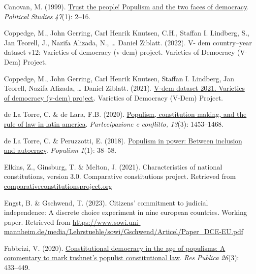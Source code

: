 \documentclass[
  abstract]{article}
\newlength{\cslhangindent}
\newlength{\cslentryspacingunit} %
\newenvironment{CSLReferences}[2] %
 {%
  \setlength{\parindent}{0pt}
  \ifodd #1
  \let\oldpar\par
  \def\par{\hangindent=\cslhangindent\oldpar}
  \fi
  \setlength{\parskip}{#2\cslentryspacingunit}
 }%
 {}
\begin{document}
\begin{CSLReferences}{1}{0}
\leavevmode{}%
Canovan, M. (1999). \href{https://doi.org/10.1111/1467-9248.00184}{Trust
the people! Populism and the two faces of democracy}. \emph{Political
Studies} \emph{47}(1): 2--16.

\leavevmode{}%
Coppedge, M., John Gerring, Carl Henrik Knutsen, C.H., Staffan I.
Lindberg, S., Jan Teorell, J., Nazifa Alizada, N., \ldots{} Daniel
Ziblatt. (2022). V- dem country--year dataset v12: Varieties of
democracy (v-dem) project. {Varieties of Democracy (V-Dem) Project}.

\leavevmode{}%
Coppedge, M., John Gerring, Carl Henrik Knutsen, Staffan I. Lindberg,
Jan Teorell, Nazifa Alizada, \ldots{} Daniel Ziblatt. (2021).
\href{https://doi.org/10.23696/VDEMDS21}{V-dem dataset 2021. Varieties
of democracy (v-dem) project}. {Varieties of Democracy (V-Dem) Project}.

\leavevmode{}%
de La Torre, C. \& de Lara, F.B. (2020).
\href{https://doi.org/10.1285/I20356609V13I3P1453}{Populism,
constitution making, and the rule of law in latin america}.
\emph{Partecipazione e conflitto,} \emph{13}(3): 1453--1468.

\leavevmode{}%
de La Torre, C. \& Peruzzotti, E. (2018).
\href{https://doi.org/10.1163/25888072-01011002}{Populism in power:
Between inclusion and autocracy}. \emph{Populism} \emph{1}(1): 38--58.

\leavevmode{}%
Elkins, Z., Ginsburg, T. \& Melton, J. (2021). Characteristics of
national constitutions, version 3.0. Comparative constitutions project.
Retrieved from
\href{https://comparativeconstitutionsproject.org}{comparativeconstitutionsproject.org}

\leavevmode{}%
Engst, B. \& Gschwend, T. (2023). Citizens' commitment to judicial
independence: A discrete choice experiment in nine european countries.
Working paper. Retrieved from
\url{https://www.sowi.uni-mannheim.de/media/Lehrstuehle/sowi/Gschwend/Articel/Paper_DCE-EU.pdf}

\leavevmode{}%
Fabbrizi, V. (2020).
\href{https://doi.org/10.1007/s11158-019-09430-7}{Constitutional
democracy in the age of populisms: A commentary to mark tushnet's
populist constitutional law}. \emph{Res Publica} \emph{26}(3): 433--449.


\end{CSLReferences}
\end{document}
